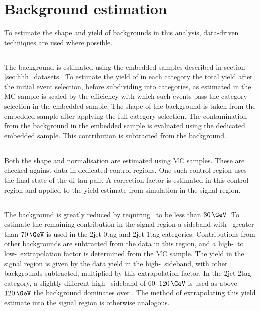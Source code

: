 \section{Background estimation}
\label{sec:hhh_backgrounds}
To estimate the shape and yield of backgrounds in this analysis, data-driven techniques are
used where possible. 
\subsection{\texorpdfstring{\Ztautau}{Z to tau tau}}
\label{sec:hhh_backgrounds_ztt}
The \Ztautau background is estimated using the embedded samples
described in section \ref{sec:hhh_datasets}. To estimate the 
yield of \Ztautau in each category the total
yield after the initial event selection, before subdividing into categories, as
estimated in the \Ztautau \ac{MC} sample is scaled by the efficiency with which 
such events pass the category selection in the embedded sample. The shape of
the \Ztautau background is taken from the embedded sample after applying the full
category selection. The contamination from the \ttbar background in the embedded
sample is evaluated using the dedicated \ttbar embedded sample. This contribution
is subtracted from the \Ztautau background.
\subsection{\texorpdfstring{\ttbar}{ttbar}}
Both the \ttbar shape and normalisation are estimated using \ac{MC} samples.
These are checked against data in dedicated control regions. One such control
region uses the \emu final state of the di-tau pair. A correction factor is estimated in 
this control region and applied to the yield estimate from simulation in the signal region. 
\subsection{\texorpdfstring{\Wjets}{W + jets}}
\label{sec:hhh_backgrounds_wjets}
The \Wjets background is greatly reduced by requiring \mT~to
be less than $30\,\GeV$. To estimate the remaining contribution
in the signal region a sideband with \mT~greater
than $70\,\GeV$ is used in the 2jet-0tag and 2jet-1tag categories.
Contributions from other backgrounds are subtracted 
from the data in this region, and a high-\mT~to low-\mT~extrapolation
 factor is determined from the \Wjets \ac{MC} 
sample. The yield in the signal region is given by the data yield in the high-\mT~sideband, with
other backgrounds subtracted, multiplied by this extrapolation factor.
In the 2jet-2tag category, a slightly different high-\mT~sideband of $60$--$120\,\GeV$ is used 
as above $120\,\GeV$ the \ttbar background dominates over \Wjets. 
The method of extrapolating this yield estimate into
the signal region is otherwise analogous.

